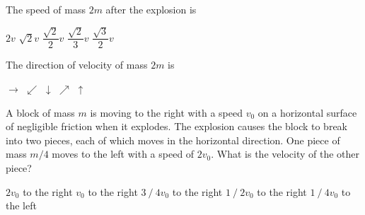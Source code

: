 \documentclass{../../../oss-ap12ibhl-print}
\begin{document}
\begin{questions}

  \question The speed of mass $2m$ after the explosion is
  \label{explode1}
  \begin{choices}
    \choice $2v$
    \choice $\displaystyle\sqrt2v$
    \choice $\dfrac{\sqrt2}2v$
    \choice $\dfrac{\sqrt2}3v$
    \choice $\dfrac{\sqrt3}2v$
  \end{choices}
  
  \question The direction of velocity of mass $2m$ is
  \label{explode2}
  \begin{choices}
    \choice $\rightarrow$
    \choice $\swarrow$
    \choice $\downarrow$
    \choice $\nearrow$
    \choice $\uparrow$
  \end{choices}
  
  \question A block of mass $m$ is moving to the right with a speed $v_0$ on a
  horizontal surface of negligible friction when it explodes. The explosion
  causes the block to break into two pieces, each of which moves in the
  horizontal direction. One piece of mass $m/4$ moves to the left with a speed
  of $2v_0$. What is the velocity of the other piece?
  \begin{choices}
    \choice$2v_0$ to the right
    \choice$v_0$ to the right
    \choice$3⁄4 v_0$ to the right
    \choice$1⁄2 v_0$ to the right
    \choice$1⁄4 v_0$ to the left
  \end{choices}
  \newpage
  

\end{questions}
\end{document}
